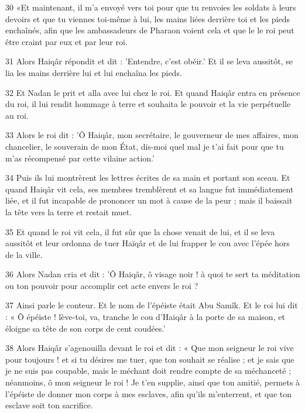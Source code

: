 \par 30 «Et maintenant, il m'a envoyé vers toi pour que tu renvoies les soldats à leurs devoirs et que tu viennes toi-même à lui, les mains liées derrière toi et les pieds enchaînés, afin que les ambassadeurs de Pharaon voient cela et que le le roi peut être craint par eux et par leur roi.

\par 31 Alors Haiqâr répondit et dit : 'Entendre, c'est obéir.' Et il se leva aussitôt, se lia les mains derrière lui et lui enchaîna les pieds.

\par 32 Et Nadan le prit et alla avec lui chez le roi. Et quand Haiqâr entra en présence du roi, il lui rendit hommage à terre et souhaita le pouvoir et la vie perpétuelle au roi.

\par 33 Alors le roi dit : 'Ô Haiqâr, mon secrétaire, le gouverneur de mes affaires, mon chancelier, le souverain de mon État, dis-moi quel mal je t'ai fait pour que tu m'as récompensé par cette vilaine action.'

\par 34 Puis ils lui montrèrent les lettres écrites de sa main et portant son sceau. Et quand Haiqâr vit cela, ses membres tremblèrent et sa langue fut immédiatement liée, et il fut incapable de prononcer un mot à cause de la peur ; mais il baissait la tête vers la terre et restait muet.

\par 35 Et quand le roi vit cela, il fut sûr que la chose venait de lui, et il se leva aussitôt et leur ordonna de tuer Haïqâr et de lui frapper le cou avec l'épée hors de la ville.

\par 36 Alors Nadan cria et dit : 'Ô Haiqâr, ô visage noir ! à quoi te sert ta méditation ou ton pouvoir pour accomplir cet acte envers le roi ?

\par 37 Ainsi parle le conteur. Et le nom de l'épéiste était Abu Samîk. Et le roi lui dit : « Ô épéiste ! lève-toi, va, tranche le cou d'Haiqâr à la porte de sa maison, et éloigne sa tête de son corps de cent coudées.'

\par 38 Alors Haiqâr s'agenouilla devant le roi et dit : « Que mon seigneur le roi vive pour toujours ! et si tu désires me tuer, que ton souhait se réalise ; et je sais que je ne suis pas coupable, mais le méchant doit rendre compte de sa méchanceté ; néanmoins, ô mon seigneur le roi ! Je t'en supplie, ainsi que ton amitié, permets à l'épéiste de donner mon corps à mes esclaves, afin qu'ils m'enterrent, et que ton esclave soit ton sacrifice.


